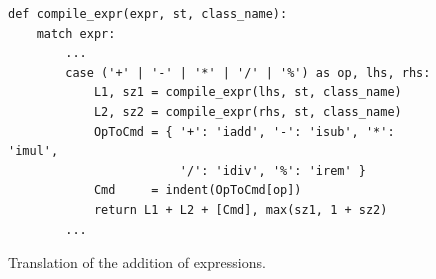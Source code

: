 \begin{figure}[!ht]
\centering
\begin{verbatim}
def compile_expr(expr, st, class_name):
    match expr:
        ...
        case ('+' | '-' | '*' | '/' | '%') as op, lhs, rhs:
            L1, sz1 = compile_expr(lhs, st, class_name)
            L2, sz2 = compile_expr(rhs, st, class_name)
            OpToCmd = { '+': 'iadd', '-': 'isub', '*': 'imul',
                        '/': 'idiv', '%': 'irem' }
            Cmd     = indent(OpToCmd[op])
            return L1 + L2 + [Cmd], max(sz1, 1 + sz2)
        ...
\end{verbatim}
\vspace*{-0.3cm}
\caption{Translation of the addition of expressions.}
\label{fig:Compiler.ipynb:compile:iadd}
\end{figure}


